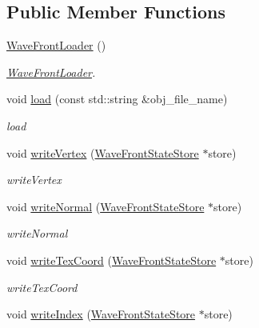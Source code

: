 \subsection*{Public Member Functions}
\begin{DoxyCompactItemize}
\item 
\hyperlink{classEngine_1_1WaveFrontLoader_a987536381fc68235f7d8d9ebe9b357f6}{Wave\+Front\+Loader} ()
\begin{DoxyCompactList}\small\item\em \hyperlink{classEngine_1_1WaveFrontLoader}{Wave\+Front\+Loader}. \end{DoxyCompactList}\item 
void \hyperlink{classEngine_1_1WaveFrontLoader_aa7a0ffee4fb69d51efa24707ffb03575}{load} (const std\+::string \&obj\+\_\+file\+\_\+name)
\begin{DoxyCompactList}\small\item\em load \end{DoxyCompactList}\item 
void \hyperlink{classEngine_1_1WaveFrontLoader_a2b952f66cfe5d54b5527ea73c63c1e76}{write\+Vertex} (\hyperlink{structEngine_1_1WaveFrontLoader_1_1WFL__StateStore}{Wave\+Front\+State\+Store} $\ast$store)
\begin{DoxyCompactList}\small\item\em write\+Vertex \end{DoxyCompactList}\item 
void \hyperlink{classEngine_1_1WaveFrontLoader_a95f58f1842a414419901c5bf289ee791}{write\+Normal} (\hyperlink{structEngine_1_1WaveFrontLoader_1_1WFL__StateStore}{Wave\+Front\+State\+Store} $\ast$store)
\begin{DoxyCompactList}\small\item\em write\+Normal \end{DoxyCompactList}\item 
void \hyperlink{classEngine_1_1WaveFrontLoader_a5a59f02df20d15946a61e9cc54fee9f4}{write\+Tex\+Coord} (\hyperlink{structEngine_1_1WaveFrontLoader_1_1WFL__StateStore}{Wave\+Front\+State\+Store} $\ast$store)
\begin{DoxyCompactList}\small\item\em write\+Tex\+Coord \end{DoxyCompactList}\item 
void \hyperlink{classEngine_1_1WaveFrontLoader_a81d3b794a294a4411324b2a07e328daa}{write\+Index} (\hyperlink{structEngine_1_1WaveFrontLoader_1_1WFL__StateStore}{Wave\+Front\+State\+Store} $\ast$store)

\end{DoxyCompactItemize}
